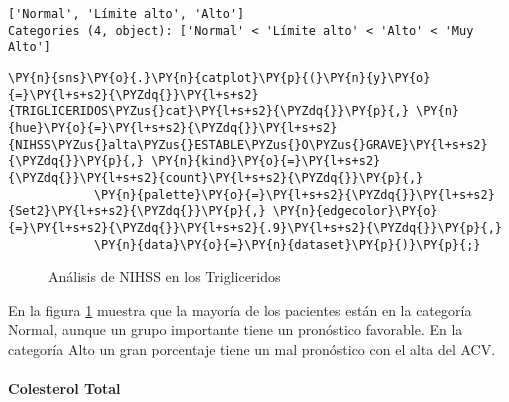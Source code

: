             \begin{tcolorbox}[breakable, size=fbox, boxrule=.5pt, pad at break*=1mm, opacityfill=0]
\begin{Verbatim}[commandchars=\\\{\}]
['Normal', 'Límite alto', 'Alto']
Categories (4, object): ['Normal' < 'Límite alto' < 'Alto' < 'Muy Alto']
\end{Verbatim}
\end{tcolorbox}
        
    \begin{tcolorbox}[breakable, size=fbox, boxrule=1pt, pad at break*=1mm,colback=cellbackground, colframe=cellborder]
\begin{Verbatim}[commandchars=\\\{\}]
\PY{n}{sns}\PY{o}{.}\PY{n}{catplot}\PY{p}{(}\PY{n}{y}\PY{o}{=}\PY{l+s+s2}{\PYZdq{}}\PY{l+s+s2}{TRIGLICERIDOS\PYZus{}cat}\PY{l+s+s2}{\PYZdq{}}\PY{p}{,} \PY{n}{hue}\PY{o}{=}\PY{l+s+s2}{\PYZdq{}}\PY{l+s+s2}{NIHSS\PYZus{}alta\PYZus{}ESTABLE\PYZus{}O\PYZus{}GRAVE}\PY{l+s+s2}{\PYZdq{}}\PY{p}{,} \PY{n}{kind}\PY{o}{=}\PY{l+s+s2}{\PYZdq{}}\PY{l+s+s2}{count}\PY{l+s+s2}{\PYZdq{}}\PY{p}{,}
            \PY{n}{palette}\PY{o}{=}\PY{l+s+s2}{\PYZdq{}}\PY{l+s+s2}{Set2}\PY{l+s+s2}{\PYZdq{}}\PY{p}{,} \PY{n}{edgecolor}\PY{o}{=}\PY{l+s+s2}{\PYZdq{}}\PY{l+s+s2}{.9}\PY{l+s+s2}{\PYZdq{}}\PY{p}{,}
            \PY{n}{data}\PY{o}{=}\PY{n}{dataset}\PY{p}{)}\PY{p}{;}
\end{Verbatim}
\end{tcolorbox}

\begin{center}
    	\begin{figure}[H]
	\centering
	\caption{Análisis de NIHSS en los Trigliceridos}
	\label{fig:aNISStri}
	\end{figure}
\end{center}
    
    En la figura \ref{fig:aNISStri} muestra que la mayoría de los pacientes están en la categoría Normal, aunque un grupo importante tiene un pronóstico favorable. En la categoría Alto un gran porcentaje tiene un mal pronóstico con el alta del ACV.

    \hypertarget{colesterol-total}{%
\paragraph{Colesterol Total}\label{colesterol-total}}

